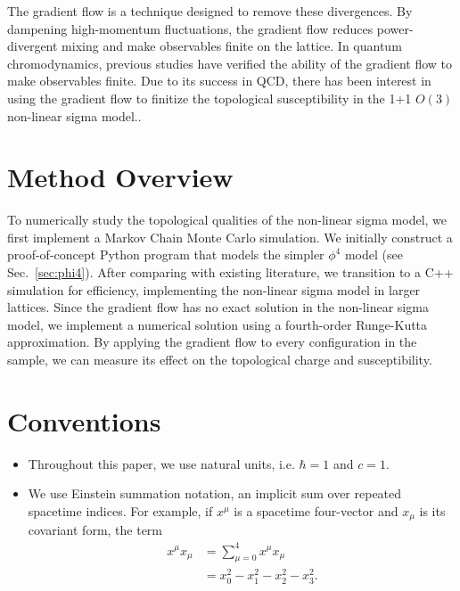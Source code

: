 The gradient flow is a technique designed to remove these divergences. By dampening high-momentum fluctuations, the gradient flow reduces power-divergent mixing and make observables finite on the lattice.\cite{monahan2016} In quantum chromodynamics, previous studies have verified the ability of the gradient flow to make observables finite\citeneeded. Due to its success in QCD, there has been interest in using the gradient flow to finitize the topological susceptibility in the 1+1 $O(3)$ non-linear sigma model.\cite{bietenholz2018}.


\section{Method Overview}

To numerically study the topological qualities of the non-linear sigma model, we first implement a Markov Chain Monte Carlo simulation. We initially construct a proof-of-concept Python program that models the simpler $\phi^4$ model (see Sec.~\ref{sec:phi4}). After comparing with existing literature, we transition to a C++ simulation for efficiency, implementing the non-linear sigma model in larger lattices. Since the gradient flow has no exact solution in the non-linear sigma model, we implement a numerical solution using a fourth-order Runge-Kutta approximation. By applying the gradient flow to every configuration in the sample, we can measure its effect on the topological charge and susceptibility.

\section{Conventions}
\begin{itemize}
    \item Throughout this paper, we use natural units, i.e. $\hbar = 1$ and $c=1$.
    \item We use Einstein summation notation, an implicit sum over repeated spacetime indices. For example, if $x^\mu$ is a spacetime four-vector and $x_\mu$ is its covariant form, the term
        \begin{align*}
            x^\mu x_\mu &= \sum^4_{\mu=0} x^\mu x_\mu \\
            &= x_0^2-x_1^2-x_2^2-x_3^2.
        \end{align*}
\end{itemize}


